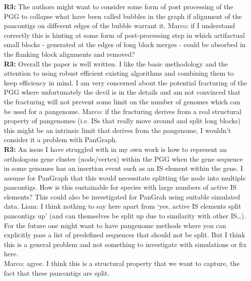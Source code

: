 \documentclass[aps,rmp,onecolumn]{revtex4-1}
\newcommand{\Marco}[1]{{\color{gray}Marco: #1}}
\newcommand{\Liam}[1]{{\color{teal}Liam: #1}}
\newcommand{\reviewer}[2]{\textbf{#1:} #2\vskip 5mm}
\begin{document}
\reviewer{R3}{The authors might want to consider some form of post processing of the PGG to collapse what have been called bubbles in the graph if alignment of the pancontigs on different edges of the bubble warrant it.}
\Marco{if I understand correctly this is hinting at some form of post-processing step in which artifactual small blocks - generated at the edges of long block merges - could be absorbed in the flanking block alignments and removed?}\\

\reviewer{R3}{Overall the paper is well written. I like the basic methodology and the attention to using robust efficient existing algorithms and combining them to keep efficiency in mind. I am very concerned about the potential fracturing of the PGG where unfortunately the devil is in the details and am not convinced that the fracturing will not prevent some limit on the number of genomes which can be used for a pangenome.}
\Marco{if the fracturing derives from a real structural property of pangenomes (i.e. ISs that really move around and split long blocks) this might be an intrinsic limit that derives from the pangenome, I wouldn't consider it a problem with PanGraph.}\\

\reviewer{R3}{An issue I have struggled with in my own work is how to represent an orthologous gene cluster (node/vertex) within the PGG when the gene sequence in some genomes has an insertion event such as an IS element within the gene. I assume for PanGraph that this would necessitate splitting the node into multiple pancontigs. How is this sustainable for species with large numbers of active IS elements? This could also be investigated for PanGrah using suitable simulated data.}
\Liam{I think nothing to say here apart from `yes, active IS elements split pancontigs up' (and can themselves be split up due to similarity with other IS\ldots). For the future one might want to have pangenome methods where you can explicitly pass a list of predefined sequences that should not be split. But I think this is a general problem and not something to investigate with simulations or fix here.}\\
\Marco{agree. I think this is a structural property that we want to capture, the fact that these pancontigs are split.}


{}
\end{document}
